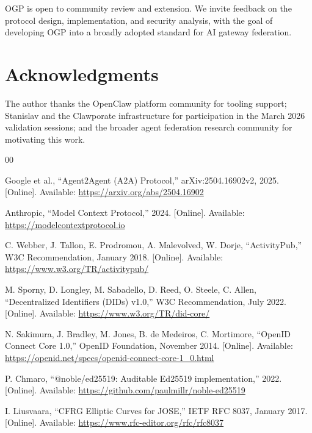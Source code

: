 \documentclass[conference]{IEEEtran}
\begin{document}
OGP is open to community review and extension. We invite feedback on the protocol design, implementation, and security analysis, with the goal of developing OGP into a broadly adopted standard for AI gateway federation.

\section*{Acknowledgments}

The author thanks the OpenClaw platform community for tooling support; Stanislav and the Clawporate infrastructure for participation in the March 2026 validation sessions; and the broader agent federation research community for motivating this work.

\begin{thebibliography}{00}

Google et al., ``Agent2Agent (A2A) Protocol,'' arXiv:2504.16902v2, 2025. [Online]. Available: \url{https://arxiv.org/abs/2504.16902}

Anthropic, ``Model Context Protocol,'' 2024. [Online]. Available: \url{https://modelcontextprotocol.io}

C. Webber, J. Tallon, E. Prodromou, A. Malevolved, W. Dorje, ``ActivityPub,'' W3C Recommendation, January 2018. [Online]. Available: \url{https://www.w3.org/TR/activitypub/}

M. Sporny, D. Longley, M. Sabadello, D. Reed, O. Steele, C. Allen, ``Decentralized Identifiers (DIDs) v1.0,'' W3C Recommendation, July 2022. [Online]. Available: \url{https://www.w3.org/TR/did-core/}

N. Sakimura, J. Bradley, M. Jones, B. de Medeiros, C. Mortimore, ``OpenID Connect Core 1.0,'' OpenID Foundation, November 2014. [Online]. Available: \url{https://openid.net/specs/openid-connect-core-1_0.html}

P. Chmaro, ``@noble/ed25519: Auditable Ed25519 implementation,'' 2022. [Online]. Available: \url{https://github.com/paulmillr/noble-ed25519}

I. Liusvaara, ``CFRG Elliptic Curves for JOSE,'' IETF RFC 8037, January 2017. [Online]. Available: \url{https://www.rfc-editor.org/rfc/rfc8037}

\end{thebibliography}
\end{document}
